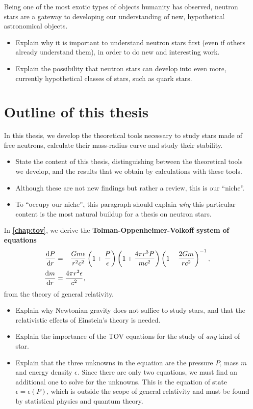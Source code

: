 Being one of the most exotic types of objects humanity has observed, neutron stars are a gateway to developing our understanding of new, hypothetical astronomical objects.
\begin{itemize}
\item Explain why it is important to understand neutron stars first (even if others already understand them), in order to do new and interesting work.
\item Explain the possibility that neutron stars can develop into even more, currently hypothetical classes of stars, such as quark stars.
\end{itemize}

\section*{Outline of this thesis}

In this thesis, we develop the theoretical tools necessary to study stars made of free neutrons, calculate their mass-radius curve and study their stability.
\begin{itemize}
\item State the content of this thesis, distinguishing between the theoretical tools we develop, and the results that we obtain by calculations with these tools.
\item Although these are not new findings but rather a review, this is our ``niche''.
\item To ``occupy our niche'', this paragraph should explain \emph{why} this particular content is the most natural buildup for a thesis on neutron stars.
\end{itemize}

In \textbf{\cref{chap:tov}}, we derive the \textbf{Tolman-Oppenheimer-Volkoff system of equations}
\begin{align*}
	\odv{P}{r} &= -\frac{G m \epsilon}{r^2 c^2} \left( 1 + \frac{P}{\epsilon} \right) \left( 1 + \frac{4 \pi r^3 P}{m c^2} \right) \left( 1 - \frac{2 G m}{r c^2} \right)^{-1} , \\
	\odv{m}{r} &= \frac{4 \pi r^2 \epsilon}{c^2} ,
\end{align*}
from the theory of general relativity.
\begin{itemize}
\item Explain why Newtonian gravity does not suffice to study stars, and that the relativistic effects of Einstein's theory is needed.
\item Explain the importance of the TOV equations for the study of \emph{any} kind of star.
\item Explain that the three unknowns in the equation are the pressure $P$, mass $m$ and energy density $\epsilon$.
      Since there are only two equations, we must find an additional one to solve for the unknowns.
      This is the equation of state $\epsilon = \epsilon(P)$, which is outside the scope of general relativity and must be found by statistical physics and quantum theory.
\end{itemize}

